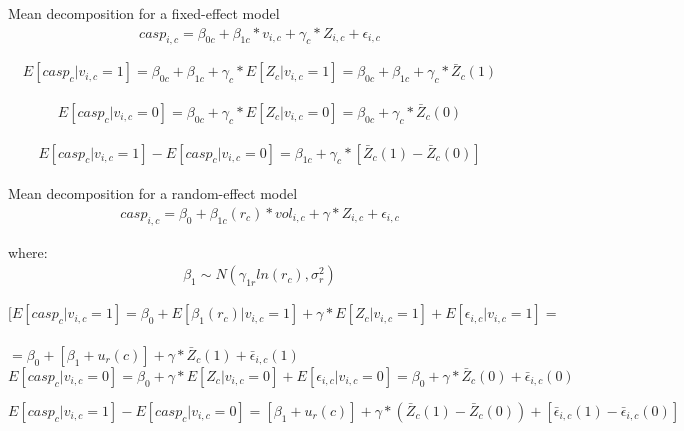 \documentclass[10pt, letterpaper]{article}
\begin{document}
\begin{spacing}{1.4}
\begin{spacing}{.9}
Mean decomposition for a fixed-effect model \\
 \begin{eqnarray}
	casp_{i,c}= \beta_{0c}+ \beta_{1c}*v_{i,c} + \gamma_{c}*Z_{i,c} + \epsilon_{i,c}
 \end{eqnarray}

\[ E[casp_{c}|v_{i,c}=1]= \beta_{0c}+\beta_{1c} + \gamma_{c}*E[Z_{c}|v_{i,c}=1]=\beta_{0c}+\beta_{1c} + \gamma_{c}*\bar{Z}_{c}(1) \]	\\
	
\[	E[casp_{c}|v_{i,c}=0]= \beta_{0c}+ \gamma_{c}*E[Z_{c}|v_{i,c}=0]=\beta_{0c}+ \gamma_{c}*\bar{Z}_{c}(0) \] \\
	
\[	E[casp_{c}|v_{i,c}=1] - E[casp_{c}|v_{i,c}=0]= \beta_{1c}+ \gamma_{c}*[\bar{Z}_{c}(1)-\bar{Z}_{c}(0)]
\] \\

Mean decomposition for a random-effect model \\

 \begin{eqnarray}
	casp_{i,c}=\beta_{0}+  \beta_{1c}(r_{c})* vol_{i,c}+\gamma*Z_{i,c} + \epsilon_{i,c} 
 \end{eqnarray}

where: 
 \begin{eqnarray}
		\beta_{1} \sim N(\gamma_{1r}ln(r_{c}),\sigma^{2}_{r})
 \end{eqnarray}

$[E[casp_{c}|v_{i,c}=1]= \beta_{0}+E[\beta_{1}(r_{c})|v_{i,c}=1] + \gamma*E[Z_{c}|v_{i,c}=1]+ E[\epsilon_{i,c}|v_{i,c}=1]=$ \\
\\
$=\beta_{0}+ [\beta_{1}+u_{r}(c)]+\gamma*\bar{Z}_{c}(1) + \bar{\epsilon}_{i,c}(1) $
\\ 
  
\[E[casp_{c}|v_{i,c}=0]= \beta_{0}+ \gamma*E[Z_{c}|v_{i,c}=0] + E[\epsilon_{i,c}|v_{i,c}=0] = \beta_{0}+  \gamma*\bar{Z}_{c}(0) + \bar{\epsilon}_{i,c}(0) \]

\[E[casp_{c}|v_{i,c}=1]-E[casp_{c}|v_{i,c}=0]= [\beta_{1}+u_{r}(c)]+ \gamma*(\bar{Z}_{c}(1)-\bar{Z}_{c}(0))+ [\bar{\epsilon}_{i,c}(1)-\bar{\epsilon}_{i,c}(0)] \]

\end{spacing}
\end{spacing}
\end{document}
